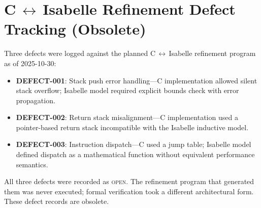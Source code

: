 
\section*{C\,$\leftrightarrow$\,Isabelle Refinement Defect Tracking (Obsolete)}

Three defects were logged against the planned C\,$\leftrightarrow$\,Isabelle
refinement program as of 2025-10-30:

\begin{itemize}
  \item \textbf{DEFECT-001}: Stack push error handling---C implementation
        allowed silent stack overflow; Isabelle model required explicit bounds
        check with error propagation.
  \item \textbf{DEFECT-002}: Return stack misalignment---C implementation used
        a pointer-based return stack incompatible with the Isabelle inductive
        model.
  \item \textbf{DEFECT-003}: Instruction dispatch---C used a jump table;
        Isabelle model defined dispatch as a mathematical function without
        equivalent performance semantics.
\end{itemize}

All three defects were recorded as \textsc{open}. The refinement program that
generated them was never executed; formal verification took a different
architectural form. These defect records are obsolete.
